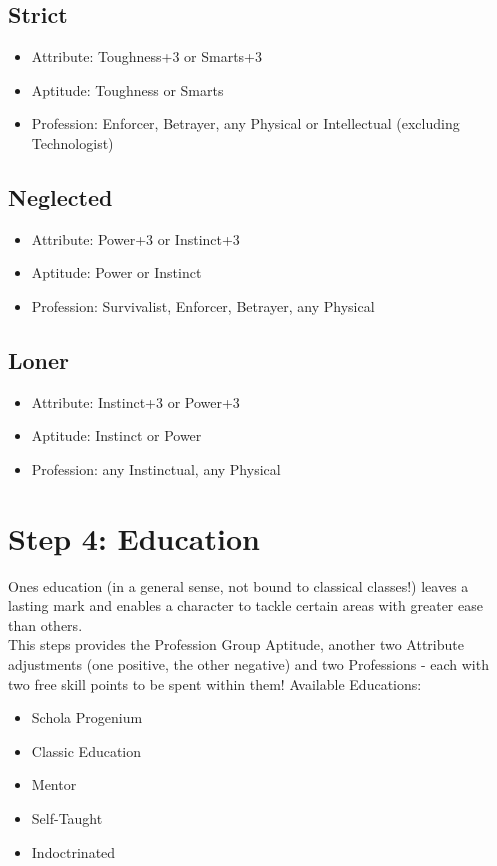 \subsection{Strict}
\begin{itemize}
	\item Attribute: Toughness+3 or Smarts+3
	\item Aptitude: Toughness or Smarts
	\item Profession: Enforcer, Betrayer, any Physical or Intellectual (excluding Technologist)
\end{itemize}

\subsection{Neglected}
\begin{itemize}
	\item Attribute: Power+3 or Instinct+3
	\item Aptitude: Power or Instinct
	\item Profession: Survivalist, Enforcer, Betrayer, any Physical
\end{itemize}

\subsection{Loner}
\begin{itemize}
	\item Attribute: Instinct+3 or Power+3
	\item Aptitude: Instinct or Power
	\item Profession: any Instinctual, any Physical
\end{itemize}


\section{Step 4: Education} %
\label{sec:lifepath_4_education}
Ones education (in a general sense, not bound to classical classes!) leaves a lasting mark and enables a character to tackle certain areas with greater ease than others.\\
This steps provides the Profession Group Aptitude, another two Attribute adjustments (one positive, the other negative) and two Professions - each with two free skill points to be spent within them! Available Educations:
\begin{itemize}
	\item Schola Progenium
	\item Classic Education
	\item Mentor
	\item Self-Taught
	\item Indoctrinated
\end{itemize}


